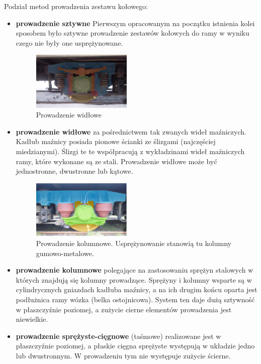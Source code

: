 Podział metod prowadzenia zestawu kołowego:
\begin{itemize}
\item \textbf{prowadzenie sztywne} 
Pierwszym opracowanym na początku istnienia kolei sposobem było sztywne prowadzenie zestawów kołowych do ramy w wyniku czego nie były one usprężynowane.
\begin{figure}
	\includegraphics[width=0.45\textwidth]{skryptkierownik-img/prowadzenie-zestawu-widlowe.jpg}
	\caption{Prowadzenie widłowe}
	\label{fig:zestawwidly}
\end{figure}
\item \textbf{prowadzenie widłowe} za pośrednictwem tak zwanych wideł maźniczych. Kadłub maźnicy posiada pionowe ścianki ze ślizgami (najczęściej miedzianymi). Ślizgi te te współpracują z wykładzinami wideł maźniczych ramy, które wykonane są ze stali. Prowadzenie widłowe może być jednostronne, dwustronne lub kątowe. 
\begin{figure}
	\includegraphics[width=0.45\textwidth]{skryptkierownik-img/prowadzenie-zestawu-kolumnowe.jpg}
	\caption{Prowadzenie kolumnowe. Usprężynowanie stanowią tu kolumny gumowo-metalowe.}
	\label{fig:zestawkolumna}
\end{figure} 
\item \textbf{prowadzenie kolumnowe} polegające na zastosowaniu sprężyn stalowych w których znajdują się kolumny prowadzące. Sprężyny i kolumny wsparte są w cylindrycznych gniazdach kadłuba maźnicy, a na ich drugim końcu oparta jest podłużnica ramy wózka (belka ostojnicowa). System ten daje dużą sztywność w płaszczyźnie poziomej, a zużycie cierne elementów prowadzenia jest niewielkie. 
\item \textbf{prowadzenie sprężyste-cięgnowe} (taśmowe) realizowane jest w płaszczyźnie poziomej, a płaskie cięgna sprężyste występują w układzie jedno lub dwustronnym. W prowadzeniu tym nie występuje zużycie ścierne. 

\end{itemize}
